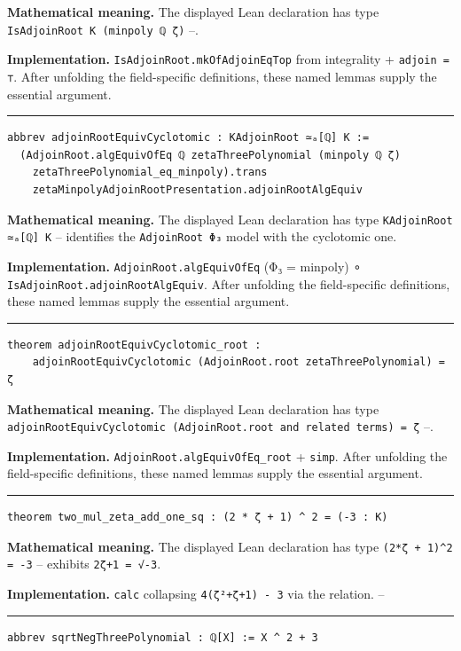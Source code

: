 \documentclass[UTF8,a4paper,11pt,fontset=fandol]{ctexart}
\theoremstyle{definition}
\newcommand{\statementsep}{\par\medskip\hrule\medskip}
\begin{document}
\noindent\textbf{Mathematical meaning.} The displayed Lean declaration has type \texttt{IsAdjoinRoot K (minpoly ℚ ζ)} --.\par
\noindent\textbf{Implementation.} \texttt{IsAdjoinRoot.\allowbreak{}mkOfAdjoinEqTop} from integrality + \texttt{adjoin = ⊤}. After unfolding the field-specific definitions, these named lemmas supply the essential argument.\par
\statementsep
\begin{verbatim}
abbrev adjoinRootEquivCyclotomic : KAdjoinRoot ≃ₐ[ℚ] K :=
  (AdjoinRoot.algEquivOfEq ℚ zetaThreePolynomial (minpoly ℚ ζ)
    zetaThreePolynomial_eq_minpoly).trans
    zetaMinpolyAdjoinRootPresentation.adjoinRootAlgEquiv
\end{verbatim}
\noindent\textbf{Mathematical meaning.} The displayed Lean declaration has type \texttt{KAdjoinRoot ≃ₐ[ℚ] K} -- identifies the \texttt{AdjoinRoot Φ₃} model with the cyclotomic one.\par
\noindent\textbf{Implementation.} \texttt{AdjoinRoot.\allowbreak{}algEquivOfEq} (Φ₃ = minpoly) ∘ \texttt{IsAdjoinRoot.\allowbreak{}adjoinRootAlgEquiv}. After unfolding the field-specific definitions, these named lemmas supply the essential argument.\par
\statementsep
\begin{verbatim}
theorem adjoinRootEquivCyclotomic_root :
    adjoinRootEquivCyclotomic (AdjoinRoot.root zetaThreePolynomial) = ζ
\end{verbatim}
\noindent\textbf{Mathematical meaning.} The displayed Lean declaration has type \texttt{adjoinRootEquivCyclotomic (AdjoinRoot.\allowbreak{}root and related terms) = ζ} --.\par
\noindent\textbf{Implementation.} \texttt{AdjoinRoot.\allowbreak{}algEquivOfEq\_\allowbreak{}root} + \texttt{simp}. After unfolding the field-specific definitions, these named lemmas supply the essential argument.\par
\statementsep
\begin{verbatim}
theorem two_mul_zeta_add_one_sq : (2 * ζ + 1) ^ 2 = (-3 : K)
\end{verbatim}
\noindent\textbf{Mathematical meaning.} The displayed Lean declaration has type \texttt{(2*ζ + 1)\textasciicircum{}2 = -3} -- exhibits \texttt{2ζ+1 = √-3}.\par
\noindent\textbf{Implementation.} \texttt{calc} collapsing \texttt{4(ζ²+ζ+1) - 3} via the relation. --\par
\statementsep
\begin{verbatim}
abbrev sqrtNegThreePolynomial : ℚ[X] := X ^ 2 + 3
\end{verbatim}
\end{document}
